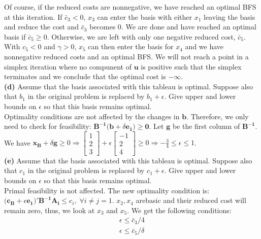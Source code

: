 \documentclass{article}
\begin{document}
\noindent
Of course, if the reduced costs are nonnegative, we have reached an optimal BFS at this iteration.  If $\bar{c}_3 < 0$, $x_3$ can enter the basis with either $x_1$ leaving the basis and reduce the cost and $\bar{c}_3$ becomes 0.  We are done and have reached an optimal basis if $\bar{c}_5 \geq 0$.  Otherwise, we are left with only one negative reduced cost, $\bar{c}_5$.   With $c_5 < 0$ and $\gamma > 0$, $x_5$ can then enter the basis for $x_4$ and we have nonnegative reduced costs and an optimal BFS.  We will not reach a point in a simplex iteration where no compunent of $\mathbf{u}$ is positive such that the simplex terminates and we conclude that the optimal cost is $-\infty$.\\

\noindent
\textbf{(d)}  Assume that the basis associated with this tableau is optimal.  Suppose also that $b_1$ in the original problem is replaced by $b_1 + \epsilon$.  Give upper and lower bounds on $\epsilon$ so that this basis remains optimal. \\
 
\noindent 
Optimality conditions are not affected by the changes in $\mathbf{b}$.  Therefore, we only need to check for feasibility:  $\mathbf{B^{-1}(b } + \delta \mathbf{e_1) \geq 0}$.  Let $\mathbf{g}$ be the first column of $\mathbf{B^{-1}}$.  \\
We have $\mathbf{x_B} + \delta \mathbf{g} \geq 0 \Rightarrow 
\begin{bmatrix}
1 \\
2 \\
3
\end{bmatrix}
+ \epsilon
\begin{bmatrix}
-1 \\
2 \\
4
\end{bmatrix}
\geq 0
\Rightarrow - \frac{3}{4} \leq \epsilon \leq 1 $. \\

\noindent
\textbf{(e)}  Assume that the basis associated with this tableau is optimal.  Suppose also that $c_1$ in the original problem is replaced by $c_1 + \epsilon$.  Give upper and lower bounds on $\epsilon$ so that this basis remains optimal. \\

\noindent
Primal feasibility is not affected.  The new optimality condition is:  $(\mathbf{c_B} + \epsilon \mathbf{e_1)' B^{-1} A_i \leq } c_i, \; \forall i \neq j = 1$. $x_2, x_4$ arebasic and their reduced cost will remain zero, thus, we look at $x_3$ and $x_5.$ We get the following conditions: \\
\begin{equation*}
\begin{aligned}
\epsilon \leq \bar{c}_3 / {4} \\
\epsilon \leq \bar{c}_5 / \delta
\end{aligned}
\end{equation*}
\end{document}
